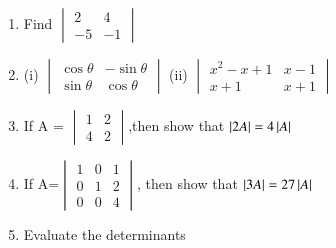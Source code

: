 \renewcommand{\theequation}{\theenumi}
\begin{enumerate}[label=\arabic*.,ref=\thesubsection.\theenumi]

\item Find 
$\begin{vmatrix}
2&4\\-5&-1
\end{vmatrix}$
\\
\solution 


\item (i) $\begin{vmatrix}\cos\theta& -\sin\theta\\ \sin\theta& \cos\theta \end{vmatrix}$ 
(ii) $\begin{vmatrix}
x^2-x+1& x-1\\ x+1&  x+1
\end{vmatrix}$
\item If A = $\begin{vmatrix}1&2\\4&2\end{vmatrix}$,then show that  
$\left\vert2A\right\vert=4\left\vert A\right\vert$
\item If A=$\begin{vmatrix}1&0&1\\0&1&2\\0&0&4\end{vmatrix}$, then show that $\left\vert3A\right\vert=27\left\vert A\right\vert$
\item Evaluate the determinants
\end{enumerate}
